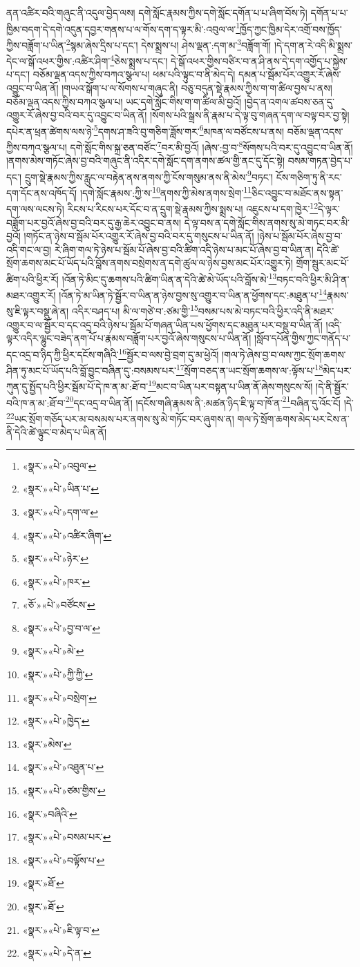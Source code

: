 ནན་འཚིར་བའི་གཞུང་ནི་འདུལ་བྱེད་ལས། དགེ་སློང་རྣམས་ཀྱིས་དགེ་སློང་དགོན་པ་པ་ཞིག་བོས་ཏེ། དགོན་པ་པ་ཁྱིམ་བདག་དེ་དགེ་འདུན་དབྱར་གནས་པ་ལ་གོས་དག་ད་ལྟར་མི་:འབུལ་ལ་\footnote{«སྣར་»«པེ་»འབུལ་}ཁྱོད་ཀྱང་ཁྱིམ་དེར་འགྲོ་བས་ཁྱོད་ཀྱིས་བཟློག་པ་ཡིན་\footnote{«སྣར་»«པེ་»ཡིན་པ་}སྙམ་ཞེས་དྲིས་པ་དང་། དེས་སྨྲས་པ། ཤེས་ལྡན་:དག་མ་\footnote{«སྣར་»«པེ་»དག་ལ་}བཟློག་གོ། །དེ་དག་ན་རེ་འདི་མི་སྨྲས་དེང་ལ་སྒོ་འཕར་གྱིས་:འཚིར་ཤིག་\footnote{«སྣར་»«པེ་»འཚིར་ཞིག་}ཅེས་སྨྲས་པ་དང་། དེ་སྒོ་འཕར་གྱིས་བཙིར་བ་ན་ཤི་ནས་དེ་དག་འགྱོད་པ་སྐྱེས་པ་དང་། བཅོམ་ལྡན་འདས་ཀྱིས་བཀའ་སྩལ་པ། ཕམ་པའི་ལྟུང་བ་ནི་མེད་དེ། དམན་པ་སྦོམ་པོར་འགྱུར་རོ་ཞེས་འབྱུང་བ་ཡིན་ནོ། །གཡའ་སྒོག་པ་ལ་སོགས་པ་གཞུང་ནི། བཅུ་བདུན་སྡེ་རྣམས་ཀྱིས་ག་ག་ཚིལ་བྱས་པ་ནས། བཅོམ་ལྡན་འདས་ཀྱིས་བཀའ་སྩལ་པ། ཡང་དགེ་སློང་གིས་ག་ག་ཚིལ་མི་བྱའོ། །བྱེད་ན་འགལ་ཚབས་ཅན་དུ་འགྱུར་རོ་ཞེས་བྱ་བའི་བར་དུ་འབྱུང་བ་ཡིན་ནོ། །སོགས་པའི་སྒྲས་ནི་རྣམ་པ་དེ་ལྟ་བུ་གཞན་དག་ལ་བལྟ་བར་བྱ་སྟེ། དཔེར་ན་ཕྲན་ཚེགས་ལས་ཉེ་\footnote{«སྣར་»«པེ་»ཉེར་}དགས་ཤ་ཟའི་བུ་གཅིག་ཟློས་གར་\footnote{«སྣར་»«པེ་»ཁར་}མཁན་ལ་བཙོངས་པ་ནས། བཅོམ་ལྡན་འདས་ཀྱིས་བཀའ་སྩལ་པ། དགེ་སློང་གིས་སྐྲ་ཅན་བཙོང་\footnote{«ཅོ་»«པེ་»བཙོངས་}བར་མི་བྱའོ། །ཞེས་:བྱ་བ་\footnote{«སྣར་»«པེ་»བྱ་བ་ལ་}སོགས་པའི་བར་དུ་འབྱུང་བ་ཡིན་ནོ། །ནགས་མེས་གཏོང་ཞེས་བྱ་བའི་གཞུང་ནི་འདིར་དགེ་སློང་དག་ནགས་ཚལ་གྱི་ནང་དུ་དོང་སྟེ། བསམ་གཏན་བྱེད་པ་དང་། དྲུག་སྡེ་རྣམས་ཀྱིས་རླུང་ལ་བརྟེན་ནས་ནགས་ཀྱི་ངོས་གསུམ་ནས་ནི་མེས་\footnote{«སྣར་»«པེ་»མེ་}བཏང་། ངོས་གཅིག་ཏུ་ནི་རང་དག་དོང་ནས་འཁོད་དོ། །དགེ་སློང་རྣམས་:ཀྱི་ས་\footnote{«སྣར་»«པེ་»ཀྱི་ཀྱི་}ནགས་ཀྱི་མེས་ནགས་སྲེག་\footnote{«སྣར་»«པེ་»བསྲེག་}ཅིང་འབྱུང་བ་མཐོང་ནས་སྟན་དག་ལས་ལངས་ཏེ། རིངས་པ་རིངས་པར་དོང་བ་ན་དྲུག་སྡེ་རྣམས་ཀྱིས་སྨྲས་པ། འཇུངས་པ་དག་ཁྱེར་\footnote{«སྣར་»«པེ་»ཁྱེད་}དེ་ལྟར་བཟློག་པར་བྱའོ་ཞེས་བྱ་བའི་བར་དུ་རྒྱ་ཆེར་འབྱུང་བ་ནས། དེ་ལྟ་བས་ན་དགེ་སློང་གིས་ནགས་སུ་མེ་གཏང་བར་མི་བྱའོ། །གཏོང་ན་ཉེས་བ་སྦོམ་པོར་འགྱུར་རོ་ཞེས་བྱ་བའི་བར་དུ་གསུངས་པ་ཡིན་ནོ། །ཉེས་པ་སྦོམ་པོར་ཞེས་བྱ་བ་འདི་གང་ལ་བྱ། རེ་ཞིག་གལ་ཏེ་ཉེས་པ་སྦོམ་པོ་ཞེས་བྱ་བའི་ཚིག་འདི་ཉེས་པ་མང་པོ་ཞེས་བྱ་བ་ཡིན་ན། དེའི་ཚེ་སྲོག་ཆགས་མང་པོ་ཡོད་པའི་བློས་ནགས་བསྲེགས་ན་དགེ་ཚུལ་ལ་ཉེས་བྱས་མང་པོར་འགྱུར་ཏེ། གྲོག་སྦུར་མང་པོ་ཚིག་པའི་ཕྱིར་རོ། །འོན་ཏེ་མིང་དུ་ཆགས་པའི་ཚིག་ཡིན་ན་དེའི་ཚེ་མེ་ཡོད་པའི་བློས་མེ་\footnote{«སྣར་»མེས་}བཏང་བའི་ཕྱིར་མི་ཤི་ན་མཐར་འགྱུར་རོ། །འོན་ཏེ་མ་ཡིན་ཏེ་སྦྱོར་བ་ཡིན་ན་ཉེས་བྱས་སུ་འགྱུར་བ་ཡིན་ན་ཕྱོགས་དང་:མཐུན་པ་\footnote{«སྣར་»«པེ་»འཐུན་པ་}རྣམས་སུ་ཇི་ལྟར་བསྡུ་ཞེ་ན། འདིར་བཤད་པ། མི་ལ་གཙེ་བ་:ཙམ་གྱི་\footnote{«སྣར་»«པེ་»ཙམ་གྱིས་}བསམ་པས་མེ་བཏང་བའི་ཕྱིར་འདི་ནི་མཐར་འགྱུར་བ་ལ་སྦྱོར་བ་དང་འདྲ་བའི་ཉེས་པ་སྦོམ་པོ་གཞན་ཡིན་པས་ཕྱོགས་དང་མཐུན་པར་བསྡུ་བ་ཡིན་ནོ། །འདི་ལྟར་འདིར་ལྷུང་བཟེད་ནག་པོ་པ་རྣམས་བཟློག་པར་བྱའོ་ཞེས་གསུངས་པ་ཡིན་ནོ། །སློབ་དཔོན་གྱིས་ཀྱང་གནོད་པ་དང་འདྲ་བ་ཉིད་ཀྱི་ཕྱིར་དངོས་གཞིའི་\footnote{«སྣར་»བཞིའི་}སྦྱོར་བ་ལས་བྱེ་བྲག་དུ་མ་ཕྱེའོ། །གལ་ཏེ་ཞེས་བྱ་བ་ལས་ཀྱང་སྲོག་ཆགས་ཤིན་ཏུ་མང་པོ་ཡོད་པའི་བློ་བྱུང་བཞིན་དུ་:བསམས་པར་\footnote{«སྣར་»«པེ་»བསམ་པར་}སྲོག་བཅད་ན་ཡང་སྲོག་ཆགས་ལ་:ལྟོས་པ་\footnote{«སྣར་»«པེ་»བལྟོས་པ་}མེད་པར་ཀུན་དུ་སྤྱོད་པའི་ཕྱིར་སྦོམ་པོ་དེ་ཁ་ན་མ་:ཐོ་བ་\footnote{«སྣར་»ཐོ་}མང་བ་ཡིན་པར་བསྟན་པ་ཡིན་ནོ་ཞེས་གསུངས་སོ། །དེ་ནི་སྦྱོར་བའི་ཁ་ན་མ་:ཐོ་བ་\footnote{«སྣར་»ཐོ་}དང་འདྲ་བ་ཡིན་ནོ། །དངོས་གཞི་རྣམས་ནི་:མཚན་ཉིད་ཇི་ལྟ་བ་ཁོ་ན་\footnote{«སྣར་»«པེ་»ཇི་ལྟ་བ་}བཞིན་དུ་འོང་ངོ། །དེ་\footnote{«སྣར་»«པེ་»དེ་ན་}ཡང་སྲོག་གཅོད་པར་མ་བསམས་པར་ནགས་སུ་མེ་གཏོང་བར་ཞུགས་ན། གལ་ཏེ་སྲོག་ཆགས་མེད་པར་ངེས་ན་ནི་དེའི་ཚེ་ལྟུང་བ་མེད་པ་ཡིན་ནོ། 